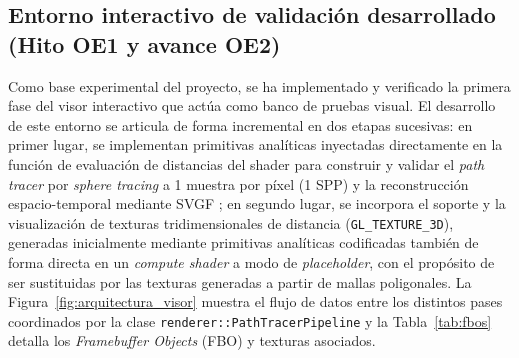 \subsection{Entorno interactivo de validación desarrollado (Hito OE1 y avance OE2)}

Como base experimental del proyecto, se ha implementado y verificado la primera fase del visor interactivo que actúa como banco de pruebas visual. El desarrollo de este entorno se articula de forma incremental en dos etapas sucesivas: en primer lugar, se implementan primitivas analíticas inyectadas directamente en la función de evaluación de distancias del shader para construir y validar el \textit{path tracer} por \textit{sphere tracing} a 1 muestra por píxel (1 SPP) y la reconstrucción espacio-temporal mediante SVGF \cite{schied2017}; en segundo lugar, se incorpora el soporte y la visualización de texturas tridimensionales de distancia (\texttt{GL\_TEXTURE\_3D}), generadas inicialmente mediante primitivas analíticas codificadas también de forma directa en un \textit{compute shader} a modo de \textit{placeholder}, con el propósito de ser sustituidas por las texturas generadas a partir de mallas poligonales. La Figura~\ref{fig:arquitectura_visor} muestra el flujo de datos entre los distintos pases coordinados por la clase \texttt{renderer::PathTracerPipeline} y la Tabla~\ref{tab:fbos} detalla los \textit{Framebuffer Objects} (FBO) y texturas asociados.

